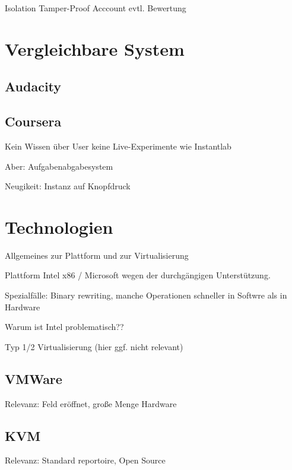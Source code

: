 		Isolation
		Tamper-Proof
		Acccount
		evtl. Bewertung

	

\section{Vergleichbare System}
\label{sec:solutions}
		
		\subsection{Audacity}
		\subsection{Coursera}

		Kein Wissen über User
		keine Live-Experimente wie Instantlab

		Aber: Aufgabenabgabesystem
		
		Neugikeit: Instanz auf Knopfdruck
		
\section{Technologien}
\label{sec:technologies}

		Allgemeines zur Plattform und zur Virtualisierung

		Plattform Intel x86 / Microsoft wegen der durchgängigen Unterstützung. \cite{PopekGoldberg}

		Spezialfälle: Binary rewriting, manche Operationen schneller in Softwre als in Hardware

		Warum ist Intel problematisch??

		Typ 1/2 Virtualisierung (hier ggf. nicht relevant)


		\subsection{VMWare}

		Relevanz: Feld eröffnet, große Menge Hardware

		\subsection{KVM}

		Relevanz: Standard reportoire, Open Source

		